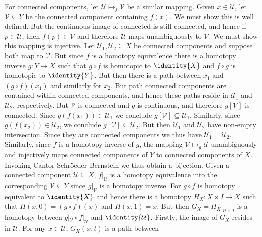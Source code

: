 \documentclass{article}                                                        %
\begin{document}
\begin{solution}
        For connected components, let $\mathcal{U}\mapsto_{f}\mathcal{V}$ be a
        similar mapping. Given $x\in\mathcal{U}$, let $\mathcal{V}\subseteq{Y}$
        be the connected component containing $f(x)$. We must show this is well
        defined. But the continuous image of connected is still connected, and
        hence if $p\in\mathcal{U}$, then $f(p)\in\mathcal{V}$ and therefore
        $\mathcal{U}$ maps unambiguously to $\mathcal{V}$. We must show this
        mapping is injective. Let $\mathcal{U}_{1},\mathcal{U}_{2}\subseteq{X}$
        be connected components and suppose both map to $\mathcal{V}$. But since
        $f$ is a homotopy equivalence there is a homotopy inverse
        $g:Y\rightarrow{X}$ such that $g\circ{f}$ is homotopic to $\identity{X}$
        and $f\circ{g}$ is homotopic to $\identity{Y}$. But then there is a path
        between $x_{1}$ and $(g\circ{f})(x_{1})$ and similarly for $x_{2}$. But
        path connected components are contained within connected components, and
        hence these paths reside in $\mathcal{U}_{1}$ and $\mathcal{U}_{2}$,
        respectively. But $\mathcal{V}$ is connected and $g$ is continuous, and
        therefore $g[\mathcal{V}]$ is connected. Since
        $g(f(x_{1}))\in\mathcal{U}_{1}$ we conclude
        $g[\mathcal{V}]\subseteq\mathcal{U}_{1}$. Similarly, since
        $g(f(x_{2}))\in\mathcal{U}_{2}$, we conclude
        $g[\mathcal{V}]\subseteq\mathcal{U}_{2}$. But then $\mathcal{U}_{1}$ and
        $\mathcal{U}_{2}$ have non-empty intersection. Since they are connected
        components we thus have $\mathcal{U}_{1}=\mathcal{U}_{2}$. Similarly,
        since $f$ is a homotopy inverse of $g$, the mapping
        $\mathcal{V}\mapsto_{g}\mathcal{U}$ unambiguously and injectively maps 
        connected components of $Y$ to connected components of $X$. Invoking
        Cantor-Schr\"{o}eder-Bernstein we thus obtain a bijection. Given
        a connected component $\mathcal{U}\subseteq{X}$, $f|_{\mathcal{U}}$ is a
        homotopy equivalence into the corresponding $\mathcal{V}\subseteq{Y}$
        since $g|_{\mathcal{V}}$ is a homotopy inverse. For $g\circ{f}$ is
        homotopy equivalent to $\identity{X}$ and hence there is a homotopy
        $H_{X}:X\times{I}\rightarrow{X}$ such that
        $H(x,0)=(g\circ{f})(x)$ and $H(x,1)=x$. But then
        $G_{X}=H_{X}|_{\mathcal{U}\times{I}}$ is a homotopy between
        $g|_{\mathcal{V}}\circ{f}|_{\mathcal{U}}$ and $\identity{\mathcal{U}}$.
        Firstly, the image of $G_{X}$ resides in $\mathcal{U}$. For any
        $x\in\mathcal{U}$, $G_{X}(x,t)$ is a path between

\end{solution}
\end{document}
